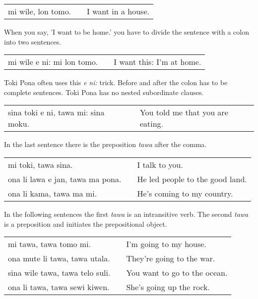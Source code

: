 \begin{supertabular}{p{5,5cm}|ll}
    mi wile, lon tomo. &  & I want in a house. \\
\end{supertabular}

When you say, 'I want to be home.' you have to divide the sentence with a colon into two sentences.

\begin{supertabular}{p{5,5cm}|ll}
    mi wile e ni: mi lon tomo. &  & I want this: I'm at home. \\
\end{supertabular}

Toki Pona often uses this \textit{e ni:} trick.
Before and after the colon has to be complete sentences.
Toki Pona has no nested subordinate clauses.

\begin{supertabular}{p{5,5cm}|ll}
    sina toki e ni, tawa mi: sina moku. &  & You told me that you are eating. \\
\end{supertabular}

%
In the last sentence there is the preposition \textit{tawa} after the comma.

\begin{supertabular}{p{5,5cm}|ll}
    mi toki, tawa sina.              &  & I talk to you.                  \\
    ona li lawa e jan, tawa ma pona. &  & He led people to the good land. \\
    ona li kama, tawa ma mi.         &  & He's coming to my country.      \\
\end{supertabular}

In the following sentences the first \textit{tawa} is an intransitive verb.
The second \textit{tawa} is a preposition and initiates the prepositional object.

\begin{supertabular}{p{5,5cm}|ll}
    mi tawa, tawa tomo mi.          &  & I'm going to my house.       \\
    ona mute li tawa, tawa utala.   &  & They're going to the war.    \\
    sina wile tawa, tawa telo suli. &  & You want to go to the ocean. \\
    ona li tawa, tawa sewi kiwen.   &  & She's going up the rock.     \\
\end{supertabular}

